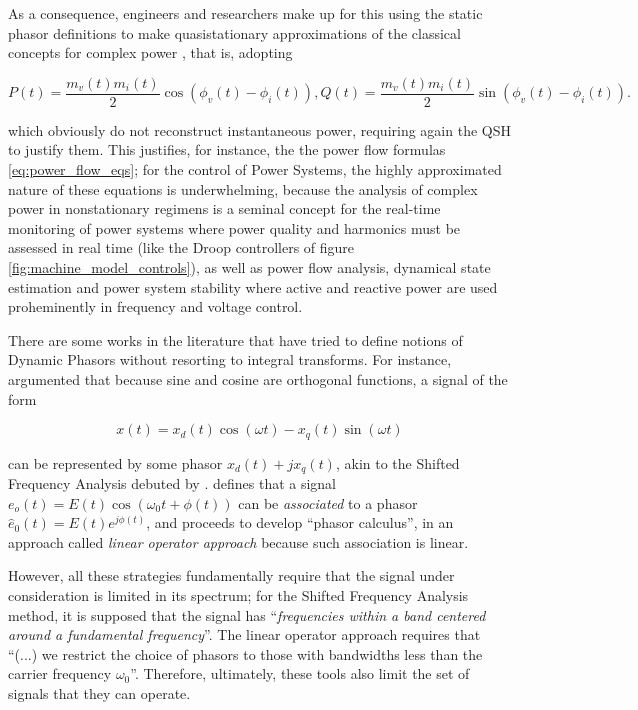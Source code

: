 	As a consequence, engineers and researchers make up for this using the static phasor definitions to make quasistationary approximations of the classical concepts for complex power , that is, adopting

\begin{equation} P(t) = \dfrac{m_v(t)m_i(t)}{2}\cos\left(\phi_v(t) - \phi_i(t)\right), Q(t) = \dfrac{m_v(t)m_i(t)}{2}\sin\left(\phi_v(t) - \phi_i(t)\right) . \label{eq:static_pq}\end{equation}

	\noindent which obviously do not reconstruct instantaneous power, requiring again the QSH to justify them. This justifies, for instance, the the power flow formulas \eqref{eq:power_flow_eqs}; for the control of Power Systems, the highly approximated nature of these equations is underwhelming, because the analysis of complex power in nonstationary regimens is a seminal concept for the real-time monitoring of power systems where power quality and harmonics must be assessed in real time (like the Droop controllers of figure \ref{fig:machine_model_controls}), as well as power flow analysis, dynamical state estimation and power system stability where active and reactive power are used proheminently in frequency and voltage control.

	There are some works in the literature that have tried to define notions of Dynamic Phasors without resorting to integral transforms. For instance, \cite{darochaComputacaoAltoDesempenho2024,danielSimuladorTransitoriosEletromagneticos2018,azevedoMetodologiaFasorialPara2024,almeidaModelagemFasorialTrifasica2024} argumented that because sine and cosine are orthogonal functions, a signal of the form

\begin{equation} x(t) = x_d(t)\cos\left(\omega t \right) - x_q(t)\sin\left(\omega t\right) \end{equation}

	\noindent can be represented by some phasor $x_d(t) + jx_q(t)$, akin to the Shifted Frequency Analysis debuted by \cite{zhangSynchronousMachineModeling2007}. \cite{Venkatasubramanian1994} defines that a signal $e_o(t) = E(t)\cos\left(\omega_0 t + \phi(t)\right)$ can be \textit{associated} to a phasor $\hat{e}_0(t) = E(t)e^{j\phi(t)}$, and proceeds to develop ``phasor calculus'', in an approach called \textit{linear operator approach} because such association is linear.

	However, all these strategies fundamentally require that the signal under consideration is limited in its spectrum; for the Shifted Frequency Analysis method, it is supposed that the signal has ``\textit{frequencies within a band centered around a fundamental frequency}''.  The linear operator approach requires that ``(...) we restrict the choice of phasors to those with bandwidths less than the carrier frequency $\omega_0$''. Therefore, ultimately, these tools also limit the set of signals that they can operate.


